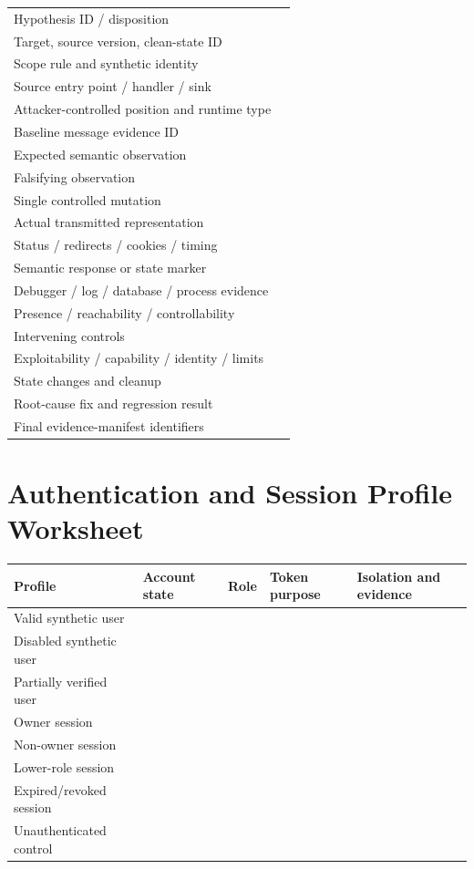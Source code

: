 \documentclass[11pt]{article}
\begin{document}
\begin{longtable}{@{}L{0.30\textwidth}L{0.60\textwidth}@{}}
\toprule
Hypothesis ID / disposition & \\
Target, source version, clean-state ID & \\
Scope rule and synthetic identity & \\
Source entry point / handler / sink & \\
Attacker-controlled position and runtime type & \\
Baseline message evidence ID & \\
Expected semantic observation & \\
Falsifying observation & \\
Single controlled mutation & \\
Actual transmitted representation & \\
Status / redirects / cookies / timing & \\
Semantic response or state marker & \\
Debugger / log / database / process evidence & \\
Presence / reachability / controllability & \\
Intervening controls & \\
Exploitability / capability / identity / limits & \\
State changes and cleanup & \\
Root-cause fix and regression result & \\
Final evidence-manifest identifiers & \\
\bottomrule
\end{longtable}

\section{Authentication and Session Profile Worksheet}

\begin{longtable}{@{}L{0.20\textwidth}L{0.16\textwidth}L{0.14\textwidth}L{0.18\textwidth}L{0.22\textwidth}@{}}
\toprule
\textbf{Profile} & \textbf{Account state} & \textbf{Role} & \textbf{Token purpose} & \textbf{Isolation and evidence} \\
\midrule
Valid synthetic user & & & & \\
Disabled synthetic user & & & & \\
Partially verified user & & & & \\
Owner session & & & & \\
Non-owner session & & & & \\
Lower-role session & & & & \\
Expired/revoked session & & & & \\
Unauthenticated control & & & & \\
\bottomrule
\end{longtable}
\end{document}
